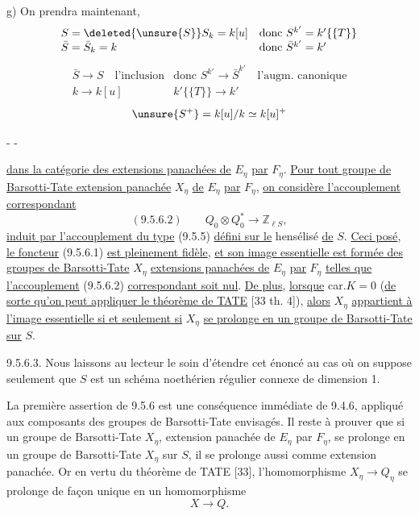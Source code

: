 g) On prendra maintenant, 
\[
\begin{array}{ll}
S=\deleted{\unsure{S}}S_k=k[u]&\text{donc }S^{k'}=k'\{\{T\}\}\\
\bar S=\bar S_k=k&\text{donc }\bar S^{k'}=k'
\end{array}
\]
\[
\begin{array}{ll}
\bar S\longrightarrow S\quad\text{l'inclusion}&\text{donc }S^{k'}\longrightarrow\bar S^{k'}\quad\text{l'augm. canonique}\\
k\longrightarrow k[u]&k'\{\{T\}\}\longrightarrow k'
\end{array}
\]
\[
 \unsure{S^+}=k[u]/k\simeq k[u]^+
\]

\begin{center}-  -\end{center}

\uline{dans la catégorie des extensions panachées de} $E_\eta$ \uline{par} $F_\eta$. \uline{Pour tout groupe de Barsotti-Tate extension panachée} $X_\eta$ \uline{de} $E_\eta$ \uline{par} $F_\eta$, \uline{on considère l'accouplement correspondant}
\[
(9.5.6.2)\qquad Q_0\otimes Q_0^*\longrightarrow\mathbb Z_{\ell S},
\]
\uline{induit par l'accouplement du type} (9.5.5) \uline{défini sur le} hensélisé \uline{de} $S$. \uline{Ceci posé}, \uline{le foncteur} (9.5.6.1) \uline{est pleinement fidèle}, \uline{et son image essentielle est formée des groupes de Barsotti-Tate} $X_\eta$ \uline{extensions panachées de} $E_\eta$ \uline{par} $F_\eta$ \uline{telles que l'accouplement} (9.5.6.2) \uline{correspondant soit nul}. \uline{De plus}, \uline{lorsque} car.$K=0$ (\uline{de sorte qu'on peut appliquer le théorème de TATE} [33 th. 4]), \uline{alors} $X_\eta$ \uline{appartient à l'image essentielle si et seulement si} $X_\eta$ \uline{se prolonge en un groupe de Barsotti-Tate sur} $S$.

9.5.6.3. Nous laissons au lecteur le soin d'étendre cet énoncé au cas où on suppose seulement que $S$ est un schéma noethérien régulier connexe de dimension 1.

La première assertion de 9.5.6 est une conséquence immédiate de 9.4.6, appliqué aux composants des groupes de Barsotti-Tate envisagés. Il reste à prouver que si un groupe de Barsotti-Tate $X_\eta$, extension panachée de $E_\eta$ par $F_\eta$, se prolonge en un groupe de Barsotti-Tate $X_\eta$ sur $S$, il se prolonge aussi comme extension panachée. Or en vertu du théorème de TATE [33], l'homomorphisme $X_\eta\longrightarrow Q_\eta$ se prolonge de façon unique en un homomorphisme
\[
 X\longrightarrow Q.
\]

